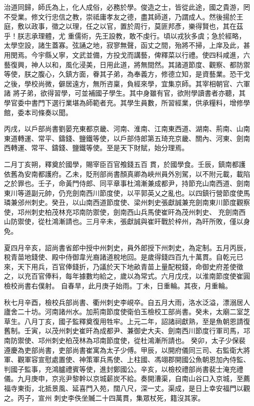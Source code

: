 \begin{pinyinscope}
 治道同歸，師氏為上，化人成俗，必務於學。俊造之士，皆從此途，國之貴游，罔不受業。修文行忠信之教，崇祗庸孝友之德，盡其師道，乃謂成人。然後揚於王庭，敷以政事，徵之以理，任之以官，置於周行，莫匪邦彥，樂得賢也，其在茲乎！朕志承理體，尤
 重儒術，先王設教，敢不虔行。頃以戎狄多虞；急於經略，太學空設，諸生蓋寡。弦誦之地，寂寥無聲，函丈之間，殆將不掃，上庠及此，甚用閔焉。今宇縣乂寧，文武並備，方投戈而講藝，俾釋菜以行禮。使四科咸進，六藝復興，神人以和，風化浸美，日用此道，將無間然。其諸道節度、觀察、都防禦等使，朕之腹心，久鎮方面，眷其子弟，為奉義方，修德立知，是資藝業。恐干戈之後，學校尚微，僻居遠方，無所咨稟，負經來學，宜集京師。其宰相朝官、六軍諸
 將子弟，欲得習學，可並補國子學生。其中身雖有官，欲附學讀書者亦聽，其學官委中書門下選行業堪為師範者充。其學生員數，所習經業，供承糧料，增修學館，委本司條奏以聞。



 丙戌，以戶部尚書劉晏充東都京畿、河南、淮南、江南東西道、湖南、荊南、山南東道轉運、常平、鑄錢、鹽鐵等使，以戶部侍郎第五琦充京畿、關內、河東、劍南西轉運、常平、鑄錢、鹽鐵等使。至是天下財賦，始分理焉。



 二月丁亥朔，釋奠於國學，賜宰臣百官飧錢五百
 貫，於國學食。壬辰，鎮南都護依舊為安南都護府。乙未，貶刑部尚書顏真卿為峽州員外別駕，以不附元載，載陷之於罪也。壬子，命黃門侍郎、同平章事杜鴻漸兼成都尹，持節充山南西道、劍南東川等道副元帥，仍充劍南西川節度使，以平郭英乂之亂也。以四鎮行營節度使馬璘兼邠州刺史。癸丑，以山南西道節度使、梁州刺史張獻誠兼充劍南東川節度觀察使，邛州刺史柏茂林充邛南防禦使，劍南西山兵馬使崔旰為茂州刺史、
 充劍南西山防禦使，從杜鴻漸請也。三月辛未，張獻誠與崔旰戰於梓州，為旰所敗，僅以身免。



 夏四月辛亥，詔尚書省郎中授中州刺史，員外郎授下州刺史，為定制。五月丙辰，稅青苗地錢使、殿中侍御韋光裔諸道稅地回。是歲得錢四百九十萬貫。自乾元已來，天下用兵，百官俸錢折，乃議於天下地畝青苗上量配稅錢，命御史府差使徵之，以充百官俸料，每年據數均給之，歲以為常式。六月戊戌，以淮南節度使崔圓檢校尚書右僕射。
 自春旱，此月庚子始雨。丁未，日重輪。其夜，月重輪。



 秋七月辛酉，檢校兵部尚書、衢州刺史李峴卒。自五月大雨，洛水泛溢，漂溺居人廬舍二十坊。河南諸州水。加荊南節度使衛伯玉檢校工部尚書。癸未，太廟二室芝草生。八月丁亥，國子監釋奠復用牲牢。上元二年，詔諸祠獻熟，至是魚朝恩請復舊制。壬寅，以茂州刺史崔旰為成都尹、兼御史大夫、劍南西川節度行軍司馬，邛南防禦使、邛州刺史柏茂林為邛南節度使，從杜鴻漸所請也。
 癸卯，太子少保裴遵慶為吏部尚書，吏部尚書崔寓為太子少傅。甲辰，以開府儀同三司、右監衛大將軍、觀軍容宣慰處置使、神策軍兵馬使、上柱國、馮翊郡開國公魚朝恩加內侍監、判國子監事，充鴻臚禮賓等使，進封鄭國公。辛亥，以檢校禮部尚書裴士淹充禮儀。九月庚申，京兆尹黎幹以京城薪炭不給。奏開漕渠，自南山谷口入京城，至薦福寺東街，北抵景風、延喜門入苑，闊八尺，深一丈。渠成，是日上幸安福門以觀之。丙子，宣州
 刺史李佚坐贓二十四萬貫，集眾杖死，籍沒其家。




\end{pinyinscope}
